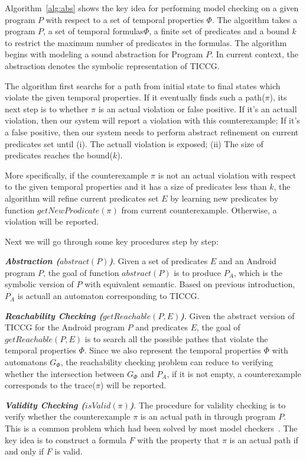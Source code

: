 \documentclass{article}
\begin{document}
Algorithm~\ref{alg:abs} shows the key idea for performing model checking on a given program $P$
 with respect to a set of temporal properties $\Phi$. The algorithm takes a program $P$, a set of temporal formulas$\Phi$, a finite set of predicates and a bound $k$ to restrict the maximum 
 number of predicates in the formulas. The algorithm begins with modeling a sound abstraction for Program $P$. In current context, the abstraction denotes the symbolic representation of TICCG.
 
 The algorithm first searchs for a path from initial state to final states which violate the 
 given temporal properties. If it eventually finds such a path($\pi$), its next step is to
whether $\pi$ is an actual violation or false positive. If it's an actuall violation, then our system will report a violation with this counterexample; If it's a false positive, then our system
needs to perform abstract refinement on current predicates set until (i). The actuall violation is exposed; (ii) The size of predicates reaches the bound($k$).  

More specifically, if the counterexample $\pi$ is not an actual violation with respect to 
the given temporal properties and it has a size of predicates less than $k$, the algorithm will 
refine current predicates set $E$ by learning new predicates by function $getNewProdicate(\pi)$
 from current counterexample. Otherwise, a violation will be reported.

Next we will go through some key procedures step by step:

{\bf \emph{Abstraction ($abstract(P)$)}}. Given a set of predicates $E$ and an Android program
$P$, the goal of function $abstract(P)$ is to produce $P_A$, which is the symbolic version of
$P$ with equivalent semantic. Based on previous introduction, $P_A$ is actuall an automaton 
corresponding to TICCG.

{\bf \emph{Reachability Checking ($getReachable(P,E)$)}}. Given the abstract version of TICCG 
for the Android program $P$ and predicates $E$, the goal of $getReachable(P,E)$ is to search
all the possible pathes that violate the temporal properties $\Phi$. Since we also represent 
the temporal properties $\Phi$ with automatons $G_{\Phi}$, the reachability checking problem can reduce to verifying whether the intersection between $G_{\Phi}$ and $P_A$, if it is not empty,
a counterexample corresponds to the trace($\pi$) will be reported.

{\bf \emph{Validity Checking ($isValid(\pi)$)}}. The procedure for validity checking is to 
verify whether the counterexample $\pi$ is an actual path in through program $P$. This is 
a common problem which had been solved by most model checkers~\cite{slam,lazy02}. The key idea is to construct 
a formula $F$ with the property that $\pi$ is an actual path if and only if $F$ is valid.
\end{document}
